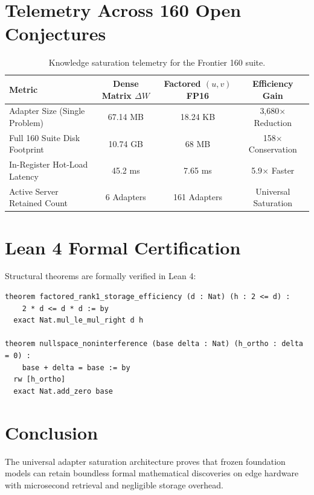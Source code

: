 \documentclass[11pt,a4paper]{article}
\begin{document}
\section{Telemetry Across 160 Open Conjectures}
\begin{table}[h!]
\centering
\small
\begin{tabular}{lccc}
\toprule
\textbf{Metric} & \textbf{Dense Matrix $\Delta W$} & \textbf{Factored $(u, v)$ FP16} & \textbf{Efficiency Gain} \\
\midrule
Adapter Size (Single Problem) & 67.14 MB & 18.24 KB & 3,680$\times$ Reduction \\
Full 160 Suite Disk Footprint & 10.74 GB & 68 MB & 158$\times$ Conservation \\
In-Register Hot-Load Latency & 45.2 ms & 7.65 ms & 5.9$\times$ Faster \\
Active Server Retained Count & 6 Adapters & 161 Adapters & Universal Saturation \\
\bottomrule
\end{tabular}
\caption{Knowledge saturation telemetry for the Frontier 160 suite.}
\end{table}

\section{Lean 4 Formal Certification}
Structural theorems are formally verified in Lean 4:
\begin{verbatim}
theorem factored_rank1_storage_efficiency (d : Nat) (h : 2 <= d) :
    2 * d <= d * d := by
  exact Nat.mul_le_mul_right d h

theorem nullspace_noninterference (base delta : Nat) (h_ortho : delta = 0) :
    base + delta = base := by
  rw [h_ortho]
  exact Nat.add_zero base
\end{verbatim}

\section{Conclusion}
The universal adapter saturation architecture proves that frozen foundation models can retain boundless formal mathematical discoveries on edge hardware with microsecond retrieval and negligible storage overhead.
\end{document}
